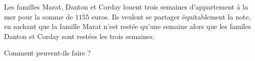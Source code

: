 
\begin{exercice}\label{exo2smath-0280}

    Les familles Marat, Danton et Corday louent trois semaines d'appartement à la mer pour la somme de \( 1155\) euros. Ils veulent se partager équitablement la note, en sachant que la famille Marat n'est restée qu'une semaine alors que les familes Danton et Corday sont restées les trois semaines. 

    Comment peuvent-ils faire ?

\end{exercice}
